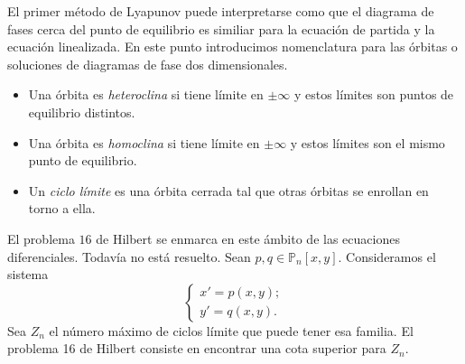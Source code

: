 El primer método de Lyapunov puede interpretarse como que el diagrama de fases cerca del punto de
equilibrio es similiar para la ecuación de partida y la ecuación linealizada. En este punto
introducimos nomenclatura para las órbitas o soluciones de diagramas de fase dos dimensionales.
\begin{itemize}
\item Una órbita es \emph{heteroclina} si tiene límite en $\pm\infty$ y estos límites son puntos de
  equilibrio distintos.
\item Una órbita es \emph{homoclina} si tiene límite en $\pm\infty$ y estos límites son el mismo
  punto de equilibrio.
\item Un \emph{ciclo límite} es una órbita cerrada tal que otras órbitas se enrollan en torno a
  ella.
\end{itemize}

El problema $16$ de Hilbert se enmarca en este ámbito de las ecuaciones diferenciales. Todavía no
está resuelto. Sean $p,q \in \mathbb{P}_n[x,y]$. Consideramos el sistema
\begin{equation}
  \label{eq:hilbert}
  \begin{cases}
    x' = p(x,y);\\
    y' = q(x,y).
  \end{cases}
\end{equation}
Sea $Z_n$ el número máximo de ciclos límite que puede tener esa familia. El problema 16 de Hilbert
consiste en encontrar una cota superior para $Z_n$.

